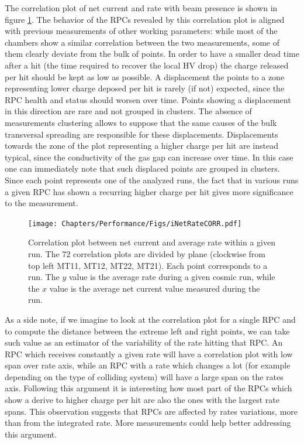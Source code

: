 The correlation plot of net current and rate with beam presence is shown in figure \ref{fig:iNetvsRate4Planes}.
The behavior of the RPCs revealed by this correlation plot is aligned with previous measurements of other working parameters: while most of the chambers show a similar correlation between the two measurements, some of them clearly deviate from the bulk of points.
In order to have a smaller dead time after a hit (the time required to recover the local HV drop) the charge released per hit should be kept as low as possible.
A displacement the points to a zone representing lower charge deposed per hit is rarely (if not) expected, since the RPC health and status should worsen over time.
Points showing a displacement in this direction are rare and not grouped in clusters.
The absence of measurements clustering allows to suppose that the same causes of the bulk transversal spreading are responsible for these displacements.
Displacements towards the zone of the plot representing a higher charge per hit are instead typical, since the conductivity of the gas gap can increase over time.
In this case one can immediately note that such displaced points are grouped in clusters.
Since each point represents one of the analyzed runs, the fact that in various runs a given RPC has shown a recurring higher charge per hit gives more significance to the measurement.

\begin{figure}[!t]
\begin{center}
\texttt{[image: Chapters/Performance/Figs/iNetRateCORR.pdf]}
\caption{Correlation plot between net current and average rate within a given run. The 72 correlation plots are divided by plane (clockwise from top left MT11, MT12, MT22, MT21). Each point corresponds to a run. The $y$ value is the average rate during a given cosmic run, while the $x$ value is the average net current value measured during the run.}
\label{fig:iNetvsRate4Planes}
\end{center}
\end{figure}

As a side note, if we imagine to look at the correlation plot for a single RPC and to compute the distance between the extreme left and right points, we can take such value as an estimator of the variability of the rate hitting that RPC.
An RPC which receives constantly a given rate will have a correlation plot with low span over rate axis, while an RPC with a rate which changes a lot (for example depending on the type of colliding system) will have a large span on the rates axis.
Following this argument it is interesting how most part of the RPCs which show a derive to higher charge per hit are also the ones with the largest rate spans.
This observation suggests that RPCs are affected by rates variations, more than from the integrated rate.
More measurements could help better addressing this argument.

